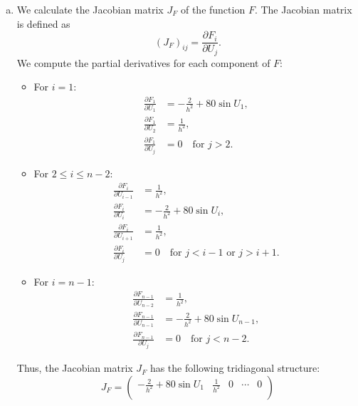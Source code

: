 \documentclass{article}
\begin{document}
\begin{enumerate}[(a)]
  \item We calculate the Jacobian matrix $J_F$ of the function $F$. The Jacobian matrix is defined as
        \begin{equation*}
          (J_F)_{ij} = \frac{\partial F_i}{\partial U_j}.
        \end{equation*}
        We compute the partial derivatives for each component of $F$:
        \begin{itemize}
          \item For $i=1$:
                \begin{align*}
                  \frac{\partial F_1}{\partial U_1} & = -\frac{2}{h^2} + 80 \sin U_1, \\
                  \frac{\partial F_1}{\partial U_2} & = \frac{1}{h^2}, \\
                  \frac{\partial F_1}{\partial U_j} & = 0 \quad \text{for } j > 2.
                \end{align*}
          \item For $2 \leq i \leq n-2$:
                \begin{align*}
                  \frac{\partial F_i}{\partial U_{i-1}} & = \frac{1}{h^2}, \\
                  \frac{\partial F_i}{\partial U_i} & = -\frac{2}{h^2} + 80 \sin U_i, \\
                  \frac{\partial F_i}{\partial U_{i+1}} & = \frac{1}{h^2}, \\
                  \frac{\partial F_i}{\partial U_j} & = 0 \quad \text{for } j < i-1 \text{ or } j > i+1.
                \end{align*}
          \item For $i=n-1$:
                \begin{align*}
                  \frac{\partial F_{n-1}}{\partial U_{n-2}} & = \frac{1}{h^2}, \\
                  \frac{\partial F_{n-1}}{\partial U_{n-1}} & = -\frac{2}{h^2} + 80 \sin U_{n-1}, \\
                  \frac{\partial F_{n-1}}{\partial U_j} & = 0 \quad \text{for } j < n-2.
                \end{align*}
        \end{itemize}
        Thus, the Jacobian matrix $J_F$ has the following tridiagonal structure:
        \begin{equation*}
          J_F = \begin{pmatrix}
            -\frac{2}{h^2} + 80 \sin U_1 & \frac{1}{h^2} & 0 & \cdots & 0 \\

\end{pmatrix}
\end{equation*}
\end{enumerate}
\end{document}
